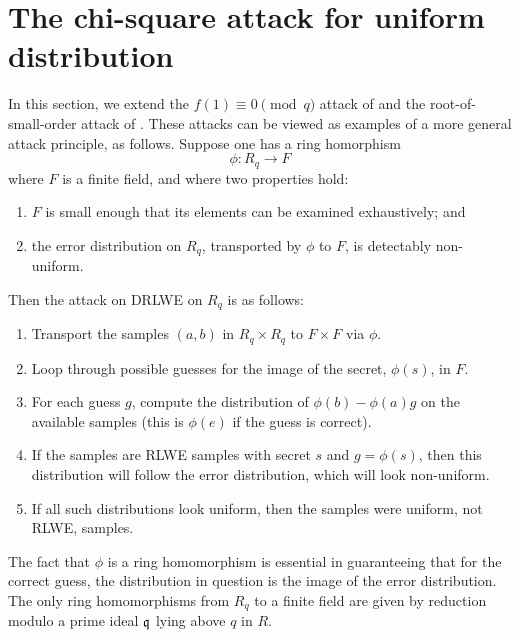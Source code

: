 \documentclass{amsart}
\begin{document}
\section{The chi-square attack for uniform distribution}
\label{sec: chi-square}

In this section, we extend the $f(1) \equiv 0 \pmod q$ attack of \cite{EHL} and the root-of-small-order attack of \cite{ELOS}.  These attacks can be viewed as examples of a more general attack principle, as follows.  Suppose one has a ring homorphism
\[
        \phi: R_q \rightarrow F 
\]
where $F$ is a finite field, and where two properties hold:
\begin{enumerate}
        \item $F$ is small enough that its elements can be examined exhaustively; and
        \item the error distribution on $R_q$, transported by $\phi$ to $F$, is detectably non-uniform.
\end{enumerate}

Then the attack on DRLWE on $R_q$ is as follows:
\begin{enumerate}
        \item Transport the samples $(a, b)$ in $R_q \times R_q$ to $F \times F$ via $\phi$.
        \item Loop through possible guesses for the image of the secret, $\phi(s)$, in $F$.
        \item For each guess $g$, compute the distribution of $\phi(b) - \phi(a)g$ on the available samples (this is $\phi(e)$ if the guess is correct).
        \item If the samples are RLWE samples with secret $s$ and $g = \phi(s)$, then this distribution will follow the error distribution, which will look non-uniform.
        \item If all such distributions look uniform, then the samples were uniform, not RLWE, samples.
\end{enumerate}

The fact that $\phi$ is a ring homomorphism is essential in guaranteeing that for the correct guess, the distribution in question is the image of the error distribution.  The only ring homomorphisms from $R_q$ to a finite field are given by reduction modulo a prime ideal $\mathfrak{q}$ lying above $q$ in $R$.
\end{document}
